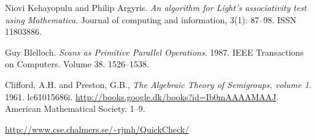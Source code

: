 \begin{thebibliography}{1}


Niovi Kehayopulu and Philip Argyris. \emph{An algorithm for Light's
associativity test using Mathematica}. Journal of computing and information,
3(1): 87--98. ISSN 11803886.


Guy Blelloch. \emph{Scans as Primitive Parallel Operations}. 1987. IEEE
Transactions on Computers. Volume 38. 1526--1538.

Clifford, A.H. and Preston, G.B.,
\emph{The Algebraic Theory of Semigroups, volume 1}. 1961.
lc61015686i. \url{http://books.google.dk/books?id=Ib0mAAAAMAAJ}.
  American Mathematical Society. 1--9.

\url{http://www.cse.chalmers.se/~rjmh/QuickCheck/}

\end{thebibliography}
